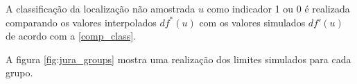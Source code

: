 \begin{figure}[H]
     \hspace{1em}
\end{figure}

A classificação da localização não amostrada $u$ como indicador 1 ou 0 é realizada comparando os valores interpolados $df^{*}(u)$ com os valores simulados $df'(u)$ de acordo com a \autoref{comp_class}.

A figura \autoref{fig:jura_groups} mostra uma realização dos limites simulados para cada grupo.

